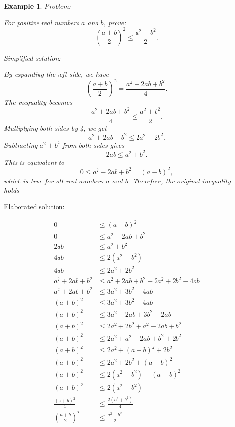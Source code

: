 \documentclass{article}
\newtheorem{example}{Example}
\begin{document}
\begin{example}
Problem:
\begin{tcolorbox}[colback=yellow!10, width=\linewidth]
For positive real numbers $a$ and $b$, prove:
    $$\left(\frac{a+b}{2}\right)^2 \leq \frac{a^2+b^2}{2}.$$
\end{tcolorbox}

Simplified solution:
\begin{tcolorbox}[colback=blue!10, width=\linewidth]
By expanding the left side, we have
\[ \left(\frac{a+b}{2}\right)^2 = \frac{a^2 + 2ab + b^2}{4}.\]
The inequality becomes
\[ \frac{a^2 + 2ab + b^2}{4} \leq \frac{a^2+b^2}{2}.\]
Multiplying both sides by 4, we get
\[ a^2 + 2ab + b^2 \leq 2a^2 + 2b^2.\]
Subtracting $a^2 + b^2$ from both sides gives
\[ 2ab \leq a^2 + b^2.\]
This is equivalent to
\[ 0 \leq a^2 - 2ab + b^2 = (a-b)^2,\]
which is true for all real numbers $a$ and $b$.  Therefore, the original inequality holds.

\end{tcolorbox}
\end{example}

Elaborated solution:
\begin{tcolorbox}[colback=green!10, width=\linewidth]
\begin{align*} 0 &\le (a-b)^2 \\ 0 &\le a^2 - 2ab + b^2 \\ 2ab &\le a^2 + b^2 \\ 4ab &\le 2(a^2 + b^2) \\ 4ab &\le 2a^2 + 2b^2 \\ a^2 + 2ab + b^2 &\le a^2 + 2ab + b^2 + 2a^2 + 2b^2 - 4ab \\ a^2 + 2ab + b^2 &\le 3a^2 + 3b^2 - 4ab \\ (a+b)^2 &\le 3a^2 + 3b^2 - 4ab \\ (a+b)^2 &\le 3a^2 - 2ab + 3b^2 - 2ab \\ (a+b)^2 &\le 2a^2 + 2b^2 + a^2 - 2ab + b^2 \\ (a+b)^2 &\le 2a^2 + a^2 - 2ab + b^2 + 2b^2 \\ (a+b)^2 &\le 2a^2 + (a-b)^2 + 2b^2 \\ (a+b)^2 &\le 2a^2 + 2b^2 + (a-b)^2 \\ (a+b)^2 &\le 2(a^2 + b^2) + (a-b)^2 \\ (a+b)^2 &\le 2(a^2 + b^2) \\ \frac{(a+b)^2}{4} &\le \frac{2(a^2+b^2)}{4} \\ \left(\frac{a+b}{2}\right)^2 &\le \frac{a^2+b^2}{2}\end{align*} 

\end{tcolorbox}
\end{document}

